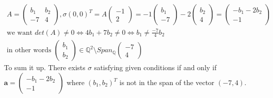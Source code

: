 \documentclass[12pt, a4paper]{article}
\begin{document}
\begin{enumerate}[label=(\alph*)]
\begin{gather*}
A = \begin{pmatrix}b_1 & b_2 \\ -7 & 4\end{pmatrix}, \sigma(0,0)^T = A\begin{pmatrix}
-1 \\ 2
\end{pmatrix} = -1 \begin{pmatrix}
b_1 \\ -7
\end{pmatrix} -2 \begin{pmatrix}
b_2 \\ 4
\end{pmatrix} = \begin{pmatrix}
-b_1 - 2b_2\\ -1
\end{pmatrix}\\
\text{we want }det(A) \neq 0 \iff 4b_1 + 7b_2 \neq 0 \iff b_1 \neq \frac{-7}{4}b_2 \\
\text{in other words } \begin{pmatrix}
b_1 \\
b_2
\end{pmatrix} \in \mathbb{Q}^2 \setminus Span_{\mathbb{Q}}{\begin{pmatrix}
-7 \\ 4
\end{pmatrix}}
\end{gather*}
To sum it up. There exists $\sigma$ satisfying given conditions if and only if $\mathbf{a} = \begin{pmatrix}
-b_1-2b_2 \\ -1
\end{pmatrix}$ where $(b_1,b_2)^T$ is not in the span of the vector $(-7, 4)$.
\end{enumerate}
\end{document}
